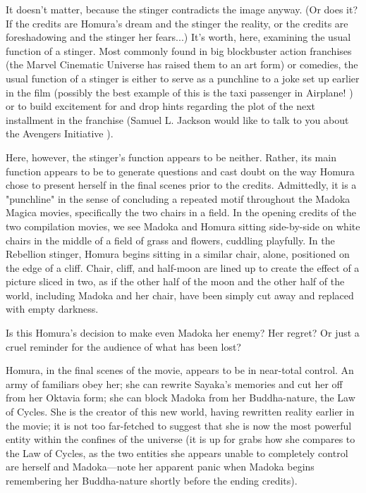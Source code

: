 It doesn't matter, because the stinger contradicts the image anyway. (Or does it? If the credits are Homura's dream and the stinger the reality, or the credits are foreshadowing and the stinger her fears...) It's worth, here, examining the usual function of a stinger. Most commonly found in big blockbuster action franchises (the Marvel Cinematic Universe has raised them to an art form) or comedies, the usual function of a stinger is either to serve as a punchline to a joke set up earlier in the film (possibly the best example of this is the taxi passenger in Airplane! \cite{ref113}) or to build excitement for and drop hints regarding the plot of the next installment in the franchise (Samuel L. Jackson would like to talk to you about the Avengers Initiative \cite{ref114}). 

Here, however, the stinger's function appears to be neither. Rather, its main function appears to be to generate questions and cast doubt on the way Homura chose to present herself in the final scenes prior to the credits. Admittedly, it is a "punchline" in the sense of concluding a repeated motif throughout the Madoka Magica movies, specifically the two chairs in a field. In the opening credits of the two compilation movies, we see Madoka and Homura sitting side-by-side on white chairs in the middle of a field of grass and flowers, cuddling playfully. In the Rebellion stinger, Homura begins sitting in a similar chair, alone, positioned on the edge of a cliff. Chair, cliff, and half-moon are lined up to create the effect of a picture sliced in two, as if the other half of the moon and the other half of the world, including Madoka and her chair, have been simply cut away and replaced with empty darkness.

Is this Homura's decision to make even Madoka her enemy? Her regret? Or just a cruel reminder for the audience of what has been lost?

Homura, in the final scenes of the movie, appears to be in near-total control. An army of familiars obey her; she can rewrite Sayaka's memories and cut her off from her Oktavia form; she can block Madoka from her Buddha-nature, the Law of Cycles. She is the creator of this new world, having rewritten reality earlier in the movie; it is not too far-fetched to suggest that she is now the most powerful entity within the confines of the universe (it is up for grabs how she compares to the Law of Cycles, as the two entities she appears unable to completely control are herself and Madoka—note her apparent panic when Madoka begins remembering her Buddha-nature shortly before the ending credits).

